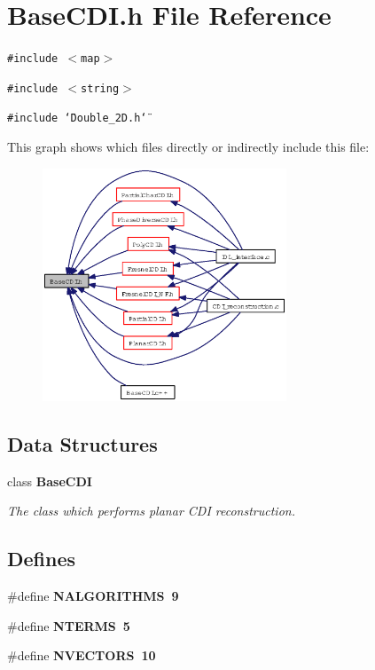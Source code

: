 \section{Base\-CDI.h File Reference}
\label{BaseCDI_8h}
{\tt \#include $<$map$>$}\par
{\tt \#include $<$string$>$}\par
{\tt \#include \char`\"{}Double\_\-2D.h\char`\"{}}\par


This graph shows which files directly or indirectly include this file:\begin{figure}[H]
\begin{center}
\leavevmode
\includegraphics[width=206pt]{BaseCDI_8h__dep__incl}
\end{center}
\end{figure}
\subsection*{Data Structures}
\begin{CompactItemize}
\item 
class \bf{Base\-CDI}
\begin{CompactList}\small\item\em The class which performs planar CDI reconstruction. \item\end{CompactList}\end{CompactItemize}
\subsection*{Defines}
\begin{CompactItemize}
\item 
\#define \bf{NALGORITHMS}~9
\item 
\#define \bf{NTERMS}~5
\item 
\#define \bf{NVECTORS}~10
\end{CompactItemize}
